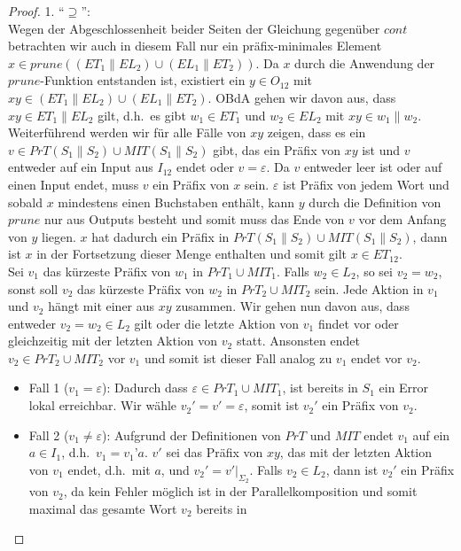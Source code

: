 \begin{proof}
  1. ``$\supseteq$'':\\
  Wegen der Abgeschlossenheit beider Seiten der Gleichung gegenüber $cont$
  betrachten wir auch in diesem Fall nur ein präfix-minimales Element $x\in
  prune((ET_1\|EL_2)\cup (EL_1\|ET_2))$. Da $x$ durch die Anwendung der
  $prune$-Funktion entstanden ist, existiert ein $y\in O_{12}$ mit
  $xy\in(ET_1\|EL_2)\cup (EL_1\|ET_2)$. OBdA gehen wir davon aus, dass
  $xy\in ET_1\|EL_2$ gilt, d.h.\ es gibt $w_1\in ET_1$ und $w_2\in EL_2$ mit
  $xy\in w_1\|w_2$.\\
  Weiterführend werden wir für alle Fälle von $xy$ zeigen, dass es ein $v\in
  PrT(S_1\|S_2)\cup MIT(S_1\|S_2)$ gibt, das ein Präfix von $xy$ ist und $v$
  entweder auf ein Input aus $I_{12}$ endet oder $v = \varepsilon$. Da $v$
  entweder leer ist oder auf einen Input endet, muss $v$ ein Präfix von $x$
  sein. $\varepsilon$ ist Präfix von jedem Wort und sobald $x$ mindestens einen
  Buchstaben enthält, kann $y$ durch die Definition von $prune$ nur aus Outputs
  besteht und somit muss das Ende von $v$ vor dem Anfang von $y$ liegen. $x$
  hat dadurch ein Präfix in $PrT(S_1\|S_2)\cup MIT(S_1\|S_2)$, dann ist $x$ in
  der Fortsetzung dieser Menge enthalten und somit gilt $x\in ET_{12}$.\\
  Sei $v_1$ das kürzeste Präfix von $w_1$ in $PrT_1\cup MIT_1$. Falls
  $w_2\in L_2$, so sei $v_2=w_2$, sonst soll $v_2$ das kürzeste Präfix von
  $w_2$ in $PrT_2\cup MIT_2$ sein. Jede Aktion in $v_1$ und $v_2$ hängt mit
  einer aus $xy$ zusammen. Wir gehen nun davon aus, dass entweder
  $v_2=w_2\in L_2$ gilt oder die letzte Aktion von $v_1$ findet vor oder
  gleichzeitig mit der letzten Aktion von $v_2$ statt. Ansonsten endet
  $v_2\in PrT_2\cup MIT_2$ vor $v_1$ und somit ist dieser Fall analog zu $v_1$
  endet vor $v_2$.
  \begin{itemize}
    \item Fall 1 ($v_1=\varepsilon$): Dadurch dass $\varepsilon\in PrT_1\cup
      MIT_1$, ist bereits in $S_1$ ein Error lokal erreichbar. Wir wähle
      $v_2'=v'=\varepsilon$, somit ist $v_2'$ ein Präfix von $v_2$.
    \item Fall 2 ($v_1\neq\varepsilon$): Aufgrund der Definitionen von $PrT$
      und $MIT$ endet $v_1$ auf ein $a\in I_1$, d.h.\ $v_1=v_1’a$. $v'$ sei das
      Präfix von $xy$, das mit der letzten Aktion von $v_1$ endet, d.h.\ mit
      $a$, und $v_2'=v'|_{\Sigma _{2}}$. Falls $v_2\in L_2$, dann ist
      $v_2'$ ein Präfix von $v_2$, da kein Fehler möglich ist in der
      Parallelkomposition und somit maximal das gesamte Wort $v_2$ bereits in

\end{itemize}
\end{proof}
